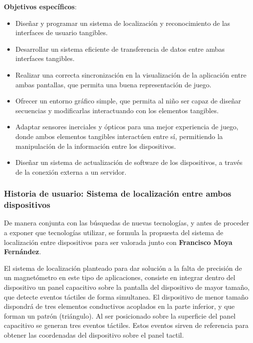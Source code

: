 \textbf{Objetivos específicos}:
\begin{itemize}
\item Diseñar y programar un sistema de localización y reconocimiento de las interfaces de usuario tangibles.

\item Desarrollar un sistema eficiente de transferencia de datos entre ambas interfaces tangibles.

\item Realizar una correcta sincronización en la visualización de la aplicación entre ambas pantallas, que permita una buena representación de juego.

\item Ofrecer un entorno gráfico simple, que permita al niño ser capaz de diseñar secuencias y modificarlas interactuando con los elementos tangibles.

\item Adaptar sensores inerciales y ópticos para una mejor experiencia de juego, donde ambos elementos tangibles interactúen entre sí, permitiendo la manipulación de la información entre los dispositivos.

\item Diseñar un sistema de actualización de software de los dispositivos, a través de la conexión externa a un servidor.
\end{itemize}

\subsubsection{Historia de usuario: Sistema de localización entre ambos dispositivos}
De manera conjunta con las búsquedas de nuevas tecnologías, y antes de proceder a exponer que tecnologías utilizar, se formula la propuesta del sistema de localización entre dispositivos para ser valorada junto con \textbf{Francisco Moya Fernández}.

El sistema de localización planteado para dar solución a la falta de precisión de un magnetómetro en este tipo de aplicaciones, consiste en integrar dentro del dispositivo un panel capacitivo sobre la pantalla del dispositivo de mayor tamaño, que detecte eventos táctiles de forma simultanea. El dispositivo de menor tamaño dispondrá de tres elementos conductivos acoplados en la parte inferior, y que forman un patrón (triángulo). Al ser posicionado sobre la superficie del panel capacitivo se generan tres eventos táctiles. Estos eventos sirven de referencia para obtener las coordenadas del dispositivo sobre el panel tactil.

